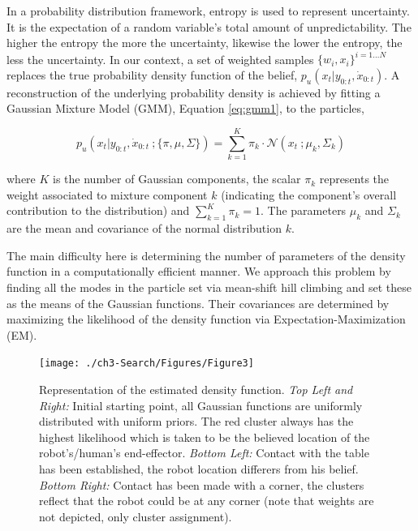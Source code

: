 
In a probability distribution framework, entropy is used to represent uncertainty. It is the expectation of a 
random variable's total amount of unpredictability. The higher the entropy the more the uncertainty, likewise the 
lower the entropy, the less the uncertainty. In our context, a set of weighted samples $\{w_{i},x_{i}\}^{i=1\dots N}$ replaces 
the true probability density function of the belief, $p_u(x_t|y_{0:t},\dot{x}_{0:t})$. A reconstruction of 
the underlying probability density is achieved by fitting a Gaussian  Mixture Model (GMM), Equation \ref{eq:gmm1}, to the particles,

\begin{equation}\label{eq:gmm1}
  p_u(x_t|y_{0:t},\dot{x}_{0:t}\: ;\{\pi,\mu,\Sigma\}) = \sum\limits_{k=1}^{K} \pi_{k} \cdot \mathcal{N}(x_t\: ;\mu_{k},\Sigma_{k} )
\end{equation}

where $K$ is the number of Gaussian components,  the scalar $\pi_{k}$ represents the weight associated to mixture component $k$ 
(indicating the component's overall contribution to the distribution) and $\sum_{k=1}^{K} \pi_{k} = 1$. The parameters $\mu_{k}$ 
and $\Sigma_{k}$ are the mean and covariance of the normal distribution $k$. 

The main difficulty here is determining the number of parameters of the density function in a computationally efficient manner.
We approach this problem by finding all the modes in the particle set via mean-shift hill climbing and set these as the 
means of the Gaussian functions. Their covariances are determined by maximizing the likelihood of the density function 
via Expectation-Maximization (EM). 
%
%

\begin{figure}
 \centering
   \texttt{[image: ./ch3-Search/Figures/Figure3]}
  \caption{Representation of the estimated density function. \textit{Top Left and Right:} Initial starting point, 
  all Gaussian functions are uniformly distributed with uniform priors. The red cluster always has the highest likelihood which is taken
  to be the believed location of the robot's/human's end-effector. \textit{Bottom Left:} Contact with the table has been established, the robot location differers
  from his belief. \textit{Bottom Right:} Contact has been made with a corner, the clusters reflect that the robot could be at any corner (note that weights are not 
  depicted, only cluster assignment).}
  \label{fig:clustering}
\end{figure}

